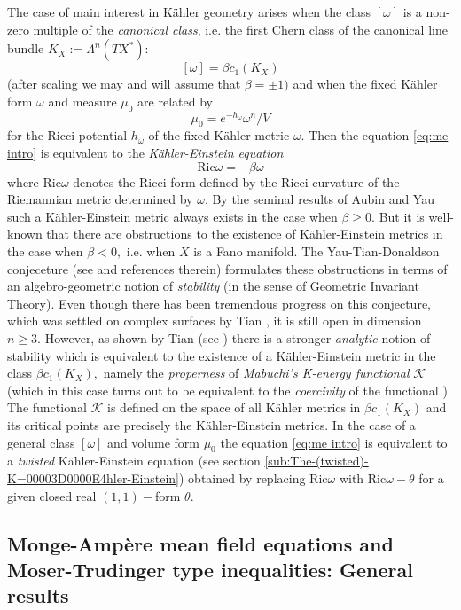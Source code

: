 \documentclass[11pt,oneside,english]{amsart}
\numberwithin{equation}{section}
\numberwithin{figure}{section}
\theoremstyle{plain}
\theoremstyle{plain}
\theoremstyle{plain}
\theoremstyle{plain}
\theoremstyle{remark}
\theoremstyle{definition}
\begin{document}
The case of main interest in Kähler geometry arises when the class
$[\omega]$ is a non-zero multiple of the\emph{ canonical class},
i.e. the first Chern class of the canonical line bundle $K_{X}:=\Lambda^{n}(TX^{*}):$
\[
[\omega]=\beta c_{1}(K_{X})
\]
 (after scaling we may and will assume that $\beta=\pm1)$ and when
the fixed Kähler form $\omega$ and measure $\mu_{0}$ are related
by 
\[
\mu_{0}=e^{-h_{\omega}}\omega^{n}/V
\]
 for the Ricci potential $h_{\omega}$ of the fixed Kähler metric
$\omega.$ Then the equation \ref{eq:me intro} is equivalent to the
\emph{Kähler-Einstein equation} 
\[
\mbox{Ric}\omega=-\beta\omega
\]
 where $\mbox{Ric}\omega$ denotes the Ricci form defined by the Ricci
curvature of the Riemannian metric determined by $\omega.$ By the
seminal results of Aubin \cite{au} and Yau \cite{y} such a Kähler-Einstein
metric always exists in the case when $\beta\geq0.$ But it is well-known
that there are obstructions to the existence of Kähler-Einstein metrics
in the case when $\beta<0,$ i.e. when $X$ is a Fano manifold. The
Yau-Tian-Donaldson conjeceture (see \cite{do,ti} and references therein)
formulates these obstructions in terms of an algebro-geometric notion
of \emph{stability} (in the sense of Geometric Invariant Theory).
Even though there has been tremendous progress on this conjecture,
which was settled on complex surfaces by Tian \cite{t-y}, it is still
open in dimension $n\geq3.$ However, as shown by Tian (see \cite{ti})
there is a stronger \emph{analytic }notion of stability which is equivalent
to the existence of a Kähler-Einstein metric in the class $\beta c_{1}(K_{X}),$
namely the \emph{properness} of \emph{Mabuchi's K-energy functional
}$\mathcal{K}$ (which in this case turns out to be equivalent to
the\emph{ coercivity} of the functional \cite{p-s+}).\emph{ }The
functional $\mathcal{K}$ is defined on the space of all Kähler metrics
in $\beta c_{1}(K_{X})$ and its critical points are precisely the
Kähler-Einstein metrics. In the case of a general class $[\omega]$
and volume form $\mu_{0}$ the equation \ref{eq:me intro} is equivalent
to a\emph{ twisted} Kähler-Einstein equation (see section \ref{sub:The-(twisted)-K=00003D0000E4hler-Einstein})
obtained by replacing $\mbox{Ric}\omega$ with $\mbox{Ric}\omega-\theta$
for a given closed real $(1,1)-$form $\theta.$ 

\subsection{Monge-Ampère mean field equations and Moser-Trudinger type inequalities:
General results }
\end{document}
